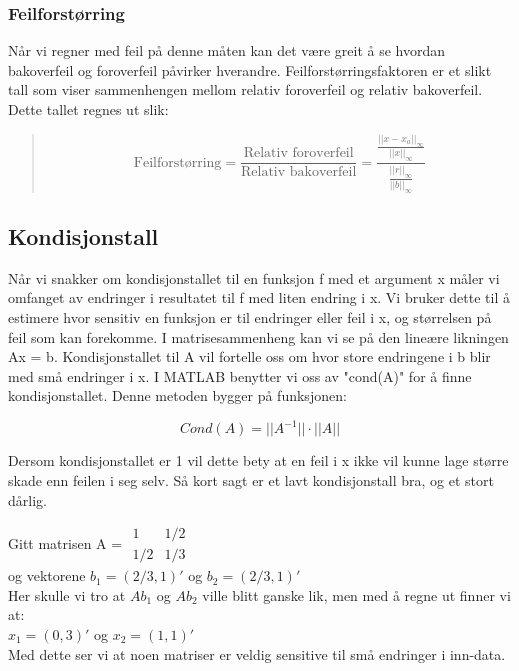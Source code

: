 \subsubsection{Feilforstørring}
Når vi regner med feil på denne måten kan det være greit å se hvordan bakoverfeil og foroverfeil påvirker hverandre. Feilforstørringsfaktoren er et slikt tall som viser sammenhengen mellom relativ foroverfeil og relativ bakoverfeil. Dette tallet regnes ut slik:
\begin{quote}
\begin{equation*}
\mbox{Feilforstørring} = \frac{\mbox{Relativ foroverfeil}}{\mbox{Relativ bakoverfeil}} = \frac{\frac{||x - x_a||_{\infty}}{||x||_{\infty}}}{\frac{||r||_{\infty}}{||b||_{\infty}}}
\end{equation*}
\end{quote}
 

 
 \subsection{Kondisjonstall}
Når vi snakker om kondisjonstallet til en funksjon f med et argument x måler vi omfanget av endringer i resultatet til f med liten endring i x. Vi bruker dette til å estimere hvor sensitiv en funksjon er til endringer eller feil i x, og størrelsen på feil som kan forekomme. I matrisesammenheng kan vi se på den lineære likningen Ax = b. Kondisjonstallet til A vil fortelle oss om hvor store endringene i b blir med små endringer i x. I MATLAB benytter vi oss av "cond(A)" for å finne kondisjonstallet. Denne metoden bygger på funksjonen:
 
 \begin{equation}
 Cond(A) = ||A^{-1}|| \cdot ||A||
 \end{equation}
 
Dersom kondisjonstallet er 1 vil dette bety at en feil i x ikke vil kunne lage større skade enn feilen i seg selv. Så kort sagt er et lavt kondisjonstall bra, og et stort dårlig. 

Gitt matrisen A = $\begin{matrix}
 
	1 & 1/2\\
	1/2 & 1/3
	
\end{matrix}$
\\
og vektorene $b_1 = (2/3, 1)'$ og $b_2 = (2/3, 1)'$
\\Her skulle vi tro at $Ab_1$ og $Ab_2$ ville blitt ganske lik, men med å regne ut finner vi at:\\$x_1 = (0, 3)'$ og $x_2 = (1, 1)'$
\\Med dette ser vi at noen matriser er veldig sensitive til små endringer i inn-data.

